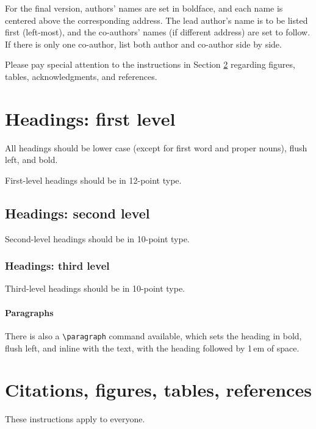 \documentclass{article}
\begin{document}
For the final version, authors' names are set in boldface, and each name is
centered above the corresponding address. The lead author's name is to be listed
first (left-most), and the co-authors' names (if different address) are set to
follow. If there is only one co-author, list both author and co-author side by
side.


Please pay special attention to the instructions in Section \ref{others}
regarding figures, tables, acknowledgments, and references.


\section{Headings: first level}
\label{headings}


All headings should be lower case (except for first word and proper nouns),
flush left, and bold.


First-level headings should be in 12-point type.


\subsection{Headings: second level}


Second-level headings should be in 10-point type.


\subsubsection{Headings: third level}


Third-level headings should be in 10-point type.


\paragraph{Paragraphs}


There is also a \verb+\paragraph+ command available, which sets the heading in
bold, flush left, and inline with the text, with the heading followed by 1\,em
of space.


\section{Citations, figures, tables, references}
\label{others}


These instructions apply to everyone.
\end{document}
